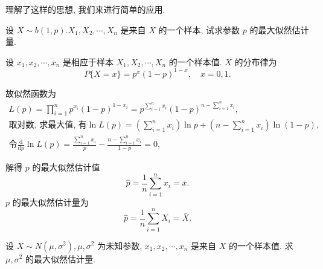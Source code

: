 理解了这样的思想, 我们来进行简单的应用. 

\begin{example}
    设 $X \sim b(1, p) . X_1, X_2, \cdots, X_n$ 是来自 $X$ 的一个样本, 试求参数 $p$ 的最大似然估计量.
\end{example}

\begin{solution}
    设 $x_1, x_2, \cdots, x_n$ 是相应于样本 $X_1, X_2, \cdots, X_n$ 的一个样本值. $X$ 的分布律为
$$
P\{X=x\}=p^x(1-p)^{1-x}, \quad x=0,1 .
$$

故似然函数为
$$
\begin{gathered}
L(p)=\prod_{i=1}^n p^{x_i}(1-p)^{1-x_i}=p^{\sum_{i=1}^n x_i}(1-p)^{n-\sum_{i=1}^n x_i}, \\
\text{取对数, 求最大值, 有}\ln L(p)=\left(\sum_{i=1}^n x_i\right) \ln p+\left(n-\sum_{i=1}^n x_i\right) \ln (1-p), \\
\text{令}\frac{\mathrm{d}}{\mathrm{d} p} \ln L(p)=\frac{\sum_{i=1}^n x_i}{p}-\frac{n-\sum_{i=1}^n x_i}{1-p}=0,
\end{gathered}
$$

解得 $p$ 的最大似然估计值
$$
\hat{p}=\frac{1}{n} \sum_{i=1}^n x_i=\bar{x} .
$$
$p$ 的最大似然估计量为
$$
\hat{p}=\frac{1}{n} \sum_{i=1}^n X_i=\bar{X} .
$$
\end{solution}

\begin{example}
    \label{ex:normal}
    设 $X \sim N\left(\mu, \sigma^2\right), \mu, \sigma^2$ 为未知参数, $x_1, x_2, \cdots, x_n$ 是来自 $X$ 的一个样本值. 求 $\mu, \sigma^2$ 的最大似然估计量.
\end{example}


